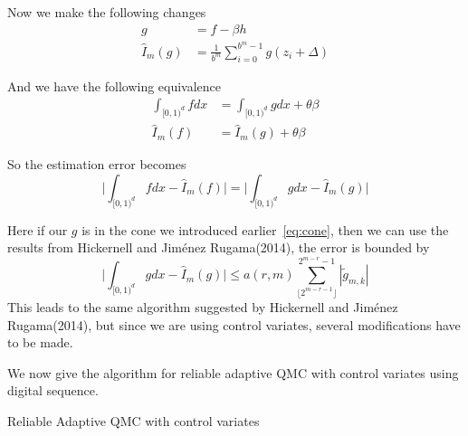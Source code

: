 
Now we make the following changes 
\begin{align*}
    g&=f-\beta h\\ 
    \hat{I}_m({g})&= \frac{1}{b^m}\sum_{i=0}^{b^m-1}g(z_i+\Delta)
\end{align*}

And we have the following equivalence 
\begin{align*}
    \int_{[0,1)^d}fdx &= \int_{[0,1)^d}gdx +\theta\beta\\ 
    \hat{I}_m(f) &= \hat{I}_m(g)+\theta\beta
\end{align*}

So the estimation error becomes 
\[
\Big| \int_{[0,1)^d}fdx- \hat{I}_m(f) \Big|
    =\Big| \int_{[0,1)^d}gdx- \hat{I}_m(g) \Big|
\]

Here if our $g$ is in the cone we introduced earlier~\eqref{eq:cone}, then we can use the results from Hickernell and Jiménez Rugama(2014)\cite{hickernell2014reliable}, the error is bounded by
\[
\Big|\int_{[0,1)^d}gdx - \hat{I}_m(g)\Big| \leq a(r,m) \sum_{\lfloor 2^{m-r-1} \rfloor}^{2^{m-r}-1} |\tilde{g}_{m,k}|
\]
This leads to the same algorithm suggested by Hickernell and Jiménez Rugama(2014)\cite{hickernell2014reliable}, but since we are using control variates, several modifications have to be made.


We now give the algorithm for reliable adaptive QMC with control variates 
using digital sequence.
\begin{algorithm}[h]
\DontPrintSemicolon
\KwData{function $f$ and $\boldsymbol{H}$; 
    value of $\int_{[0,1)^d}h_jdx=\theta_j$; tolerance $\varepsilon$} 
\caption{Reliable Adaptive QMC with control variates}\label{alg:qmccv}
\end{algorithm}

